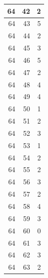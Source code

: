 \documentclass{article}
\begin{document}
\begin{multicols}{2}
{\begin{longtable}{|r|r|r|}
\hline 64 & 42 & 2 \\ 
\hline 64 & 43 & 5 \\ 
\hline 64 & 44 & 2 \\ 
\hline 64 & 45 & 3 \\ 
\hline 64 & 46 & 5 \\ 
\hline 64 & 47 & 2 \\ 
\hline 64 & 48 & 4 \\ 
\hline 64 & 49 & 4 \\ 
\hline 64 & 50 & 1 \\ 
\hline 64 & 51 & 2 \\ 
\hline 64 & 52 & 3 \\ 
\hline 64 & 53 & 1 \\ 
\hline 64 & 54 & 2 \\ 
\hline 64 & 55 & 2 \\ 
\hline 64 & 56 & 3 \\ 
\hline 64 & 57 & 2 \\ 
\hline 64 & 58 & 4 \\ 
\hline 64 & 59 & 3 \\ 
\hline 64 & 60 & 0 \\ 
\hline 64 & 61 & 3 \\ 
\hline 64 & 62 & 3 \\ 
\hline 64 & 63 & 2 \\ 
\hline

\end{longtable} 
\unskip
\unpenalty
\unpenalty}
\unvbox\ltmcbox

\end{multicols}
\end{document}
